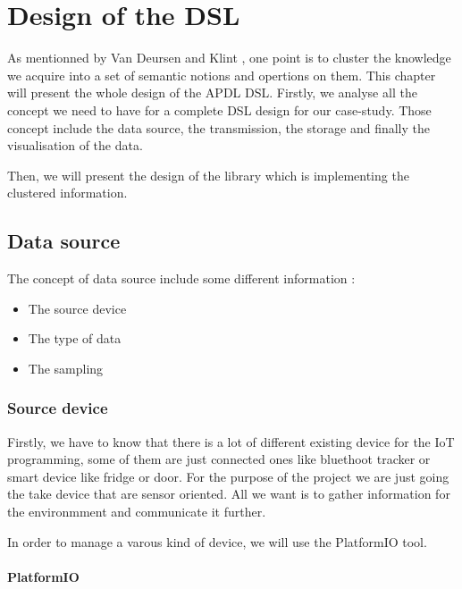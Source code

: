 \chapter{Design of the DSL}
\label{cha:dsl-design}

As mentionned by Van Deursen and Klint
\cite{little_languages_little_maintenance}, one point is to cluster the
knowledge we acquire into a set of semantic notions and opertions on them. This
chapter will present the whole design of the APDL DSL. Firstly, we analyse all
the concept we need to have for a complete DSL design for our case-study. Those
concept include the data source, the transmission, the storage and finally the
visualisation of the data.

Then, we will present the design of the library which is implementing the
clustered information.

\section{Data source}
\label{sec:dsl-design-data-source}

The concept of data source include some different information :

\begin{itemize}
\item The source device
\item The type of data
\item The sampling
\end{itemize}

\subsection{Source device}
\label{subsec:dsl-design-source-device}

Firstly, we have to know that there is a lot of different existing device for
the IoT programming, some of them are just connected ones like bluethoot tracker
or smart device like fridge or door. For the purpose of the project we are just
going the take device that are sensor oriented. All we want is to gather
information for the environmment and communicate it further.

In order to manage a varous kind of device, we will use the PlatformIO tool.

\subsubsection{PlatformIO}
\label{sec:dsl-design-source-device-platformio}

